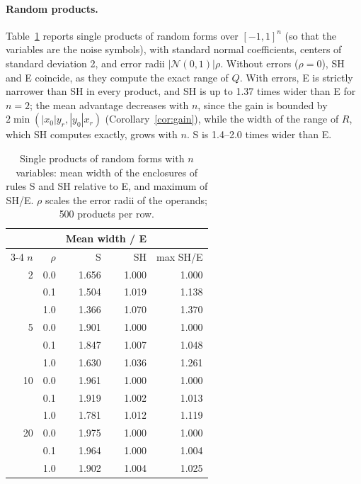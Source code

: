 \documentclass[11pt]{article}
\theoremstyle{definition}
\begin{document}
\paragraph{Random products.} Table~\ref{tab:random} reports single products of random forms over $[-1,1]^n$ (so that the variables are the noise symbols), with standard normal coefficients, centers of standard deviation 2, and error radii $|\mathcal N(0,1)|\rho$. Without errors ($\rho=0$), SH and E coincide, as they compute the exact range of $Q$. With errors, E is strictly narrower than SH in every product, and SH is up to 1.37 times wider than E for $n=2$; the mean advantage decreases with $n$, since the gain is bounded by $2\min(|x_0|y_r,|y_0|x_r)$ (Corollary~\ref{cor:gain}), while the width of the range of $R$, which SH computes exactly, grows with $n$. S is 1.4--2.0 times wider than E.

\begin{table}[t]
\centering
\caption{Single products of random forms with $n$ variables: mean width of the enclosures of rules S and SH relative to E, and maximum of SH/E. $\rho$ scales the error radii of the operands; 500 products per row.}
\label{tab:random}
\small
\begin{tabular}{rrrrr}
\toprule
 & & \multicolumn{2}{c}{Mean width / E} & \\
\cmidrule(lr){3-4}
$n$ & $\rho$ & S & SH & max SH/E \\
\midrule
2 & 0.0 & 1.656 & 1.000 & 1.000 \\
 & 0.1 & 1.504 & 1.019 & 1.138 \\
 & 1.0 & 1.366 & 1.070 & 1.370 \\
\midrule
5 & 0.0 & 1.901 & 1.000 & 1.000 \\
 & 0.1 & 1.847 & 1.007 & 1.048 \\
 & 1.0 & 1.630 & 1.036 & 1.261 \\
\midrule
10 & 0.0 & 1.961 & 1.000 & 1.000 \\
 & 0.1 & 1.919 & 1.002 & 1.013 \\
 & 1.0 & 1.781 & 1.012 & 1.119 \\
\midrule
20 & 0.0 & 1.975 & 1.000 & 1.000 \\
 & 0.1 & 1.964 & 1.000 & 1.004 \\
 & 1.0 & 1.902 & 1.004 & 1.025 \\
\bottomrule
\end{tabular}
\end{table}
\end{document}
